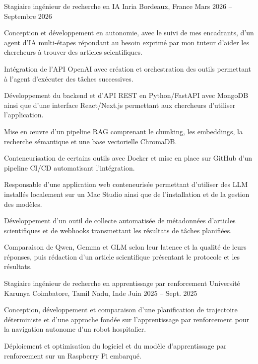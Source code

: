 
\begin{cventries}
  \cventry
    {Stagiaire ingénieur de recherche en IA}
    {Inria}
    {Bordeaux, France}
    {Mars 2026 -- Septembre 2026}
    {
      \begin{cvitems}
        \item {Conception et développement en autonomie, avec le suivi de mes encadrants, d’un agent d’IA multi-étapes répondant au besoin exprimé par mon tuteur d’aider les chercheurs à trouver des articles scientifiques.}
        \item {Intégration de l’API OpenAI avec création et orchestration des outils permettant à l’agent d’exécuter des tâches successives.}
        \item {Développement du backend et d’API REST en Python/FastAPI avec MongoDB ainsi que d’une interface React/Next.js permettant aux chercheurs d’utiliser l’application.}
        \item {Mise en œuvre d’un pipeline RAG comprenant le chunking, les embeddings, la recherche sémantique et une base vectorielle ChromaDB.}
        \item {Conteneurisation de certains outils avec Docker et mise en place sur GitHub d’un pipeline CI/CD automatisant l’intégration.}
        \item {Responsable d’une application web conteneurisée permettant d’utiliser des LLM installés localement sur un Mac Studio ainsi que de l’installation et de la gestion des modèles.}
        \item {Développement d’un outil de collecte automatisée de métadonnées d’articles scientifiques et de webhooks transmettant les résultats de tâches planifiées.}
        \item {Comparaison de Qwen, Gemma et GLM selon leur latence et la qualité de leurs réponses, puis rédaction d’un article scientifique présentant le protocole et les résultats.}
      \end{cvitems}
    }

  \cventry
    {Stagiaire ingénieur de recherche en apprentissage par renforcement}
    {Université Karunya}
    {Coimbatore, Tamil Nadu, Inde}
    {Juin 2025 -- Sept. 2025}
    {
      \begin{cvitems}
        \item {Conception, développement et comparaison d’une planification de trajectoire déterministe et d’une approche fondée sur l’apprentissage par renforcement pour la navigation autonome d’un robot hospitalier.}
        \item {Déploiement et optimisation du logiciel et du modèle d’apprentissage par renforcement sur un Raspberry Pi embarqué.}
      \end{cvitems}
    }
\end{cventries}
